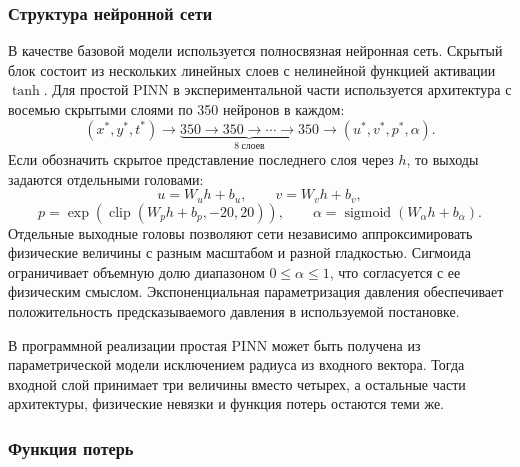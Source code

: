 \documentclass[12pt,a4paper]{article}
\begin{document}
\subsubsection{Структура нейронной сети}

В качестве базовой модели используется полносвязная нейронная сеть. Скрытый
блок состоит из нескольких линейных слоев с нелинейной функцией активации
\(\tanh\). Для простой PINN в экспериментальной части используется архитектура
с восемью скрытыми слоями по 350 нейронов в каждом:
\[
    (x^*,y^*,t^*) \rightarrow
    \underbrace{350 \rightarrow 350 \rightarrow \cdots \rightarrow 350}_{8\ \text{слоев}}
    \rightarrow
    (u^*,v^*,p^*,\alpha).
\]
Если обозначить скрытое представление последнего слоя через \(h\), то выходы
задаются отдельными головами:
\[
    u = W_u h + b_u,
    \qquad
    v = W_v h + b_v,
\]
\[
    p = \exp\left(\operatorname{clip}(W_p h+b_p,-20,20)\right),
    \qquad
    \alpha=\operatorname{sigmoid}(W_\alpha h+b_\alpha).
\]
Отдельные выходные головы позволяют сети независимо аппроксимировать физические
величины с разным масштабом и разной гладкостью. Сигмоида ограничивает
объемную долю диапазоном \(0\leq\alpha\leq1\), что согласуется с ее физическим
смыслом. Экспоненциальная параметризация давления обеспечивает положительность
предсказываемого давления в используемой постановке.

В программной реализации простая PINN может быть получена из параметрической
модели исключением радиуса из входного вектора. Тогда входной слой принимает
три величины вместо четырех, а остальные части архитектуры, физические невязки
и функция потерь остаются теми же.

\subsubsection{Функция потерь}
\end{document}
